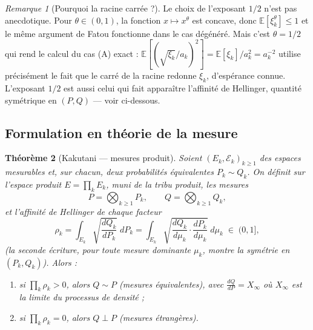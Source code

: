 \documentclass[11pt,a4paper]{article}
\theoremstyle{plain}
\newtheorem{theorem}{Théorème}[section]
\theoremstyle{definition}
\theoremstyle{remark}
\newtheorem{remark}[theorem]{Remarque}
\newcommand{\E}{\mathbb{E}}
\begin{document}
\begin{remark}[Pourquoi la racine carrée ?]
Le choix de l'exposant $1/2$ n'est pas anecdotique. Pour $\theta \in (0,1)$, la
fonction $x \mapsto x^\theta$ est concave, donc $\E[\xi_k^\theta] \le 1$ et le
même argument de Fatou fonctionne dans le cas dégénéré. Mais c'est $\theta =
1/2$ qui rend le calcul du cas (A) exact : $\E[(\sqrt{\xi_k}/a_k)^2] =
\E[\xi_k]/a_k^2 = a_k^{-2}$ utilise précisément le fait que le carré de la
racine redonne $\xi_k$, d'espérance connue. L'exposant $1/2$ est aussi celui
qui fait apparaître l'affinité de Hellinger, quantité symétrique en $(P,Q)$ ---
voir ci-dessous.
\end{remark}

\subsection{Formulation en théorie de la mesure}

\begin{theorem}[Kakutani --- mesures produit]\label{thm:kakutani-mes}
Soient $(E_k, \mathcal{E}_k)_{k\ge1}$ des espaces mesurables et, sur chacun,
deux probabilités équivalentes $P_k \sim Q_k$. On définit sur l'espace produit
$E = \prod_k E_k$, muni de la tribu produit, les mesures
\[
P = \bigotimes_{k\ge1} P_k, \qquad Q = \bigotimes_{k\ge1} Q_k,
\]
et l'\emph{affinité de Hellinger} de chaque facteur
\[
\rho_k = \int_{E_k} \sqrt{\frac{dQ_k}{dP_k}}\; dP_k
= \int_{E_k} \sqrt{\frac{dQ_k}{d\mu_k}\cdot\frac{dP_k}{d\mu_k}}\; d\mu_k
\;\in\; (0,1],
\]
(la seconde écriture, pour toute mesure dominante $\mu_k$, montre la symétrie
en $(P_k, Q_k)$). Alors :
\begin{enumerate}[label=(\Alph*)]
\item si $\prod_k \rho_k > 0$, alors $Q \sim P$ (mesures équivalentes), avec
      $\frac{dQ}{dP} = X_\infty$ où $X_\infty$ est la limite du processus de
      densité ;
\item si $\prod_k \rho_k = 0$, alors $Q \perp P$ (mesures étrangères).
\end{enumerate}
\end{theorem}
\end{document}
